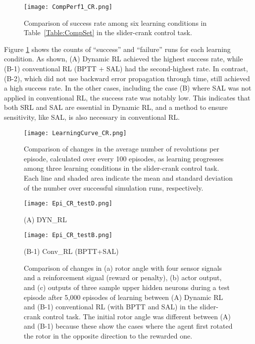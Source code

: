 \begin{figure}[ht]
\centerline{\texttt{[image: CompPerf1\_CR.png]}}
\caption{Comparison of success rate among six learning conditions in Table~\ref{Table:CompSet} in the slider-crank control task.}
\label{fig:CompPerf1_CR}
\end{figure}
Figure \ref{fig:CompPerf1_CR} shows the counts of ``success'' and ``failure'' runs for each learning condition.
As shown, (A) Dynamic RL achieved the highest success rate, while (B-1) conventional RL (BPTT + SAL) had
the second-highest rate.
In contrast, (B-2), which did not use backward error propagation through time, still achieved a high success rate.
In the other cases, including the case (B) where SAL was not applied in conventional RL,
the success rate was notably low.
This indicates that both SRL and SAL are essential in Dynamic RL, and 
a method to ensure sensitivity, like SAL, is also necessary in conventional RL.

\begin{figure}[t]
\centerline{\texttt{[image: LearningCurve\_CR.png]}}
\caption{Comparison of changes in the average number of revolutions per episode, calculated over every 100 episodes, 
as learning progresses among three learning conditions in the slider-crank control task.
Each line and shaded area indicate the mean and standard deviation of the number over successful simulation runs, respectively.}
\label{fig:LearningCurve_Crank}
\end{figure}


\begin{figure}[pth]
\center
\centerline{\texttt{[image: Epi\_CR\_testD.png]}}
\footnotesize{(A) DYN\_RL}
\vspace{3mm}
\centerline{\texttt{[image: Epi\_CR\_testB.png]}}
\footnotesize{(B-1) Conv\_RL (BPTT+SAL)}
\caption{Comparison of changes in (a) rotor angle with four sensor signals and a reinforcement signal
(reward or penalty), (b) actor output, and
(c) outputs of three sample upper hidden neurons during a test episode after 5,000 episodes of learning
between (A) Dynamic RL and (B-1) conventional RL (with BPTT and SAL) in the slider-crank control task.
The initial rotor angle was different between (A) and (B-1) because these show the cases
where the agent first rotated the rotor in the opposite direction to the rewarded one.}
\label{fig:Epi_CR_before}
\end{figure}

